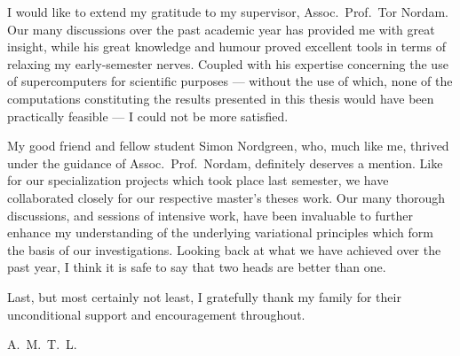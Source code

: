 I would like to extend my gratitude to my supervisor, Assoc.\ Prof.\ Tor
Nordam. Our many discussions over the past academic year has provided me with
great insight, while his great knowledge and humour proved excellent tools in
terms of relaxing my early-semester nerves. Coupled with his expertise
concerning the use of supercomputers for scientific purposes --- without the
use of which, none of the computations constituting the results presented in
this thesis would have been practically feasible --- I could not be more
satisfied.

My good friend and fellow student Simon Nordgreen, who, much like me, thrived
under the guidance of Assoc.\ Prof.\ Nordam, definitely deserves a mention. Like
for our specialization projects which took place last semester, we have
collaborated closely for our respective master's theses work. Our many thorough
discussions, and sessions of intensive work, have been invaluable to further
enhance my understanding of the underlying variational principles which form
the basis of our investigations. Looking back at what we have achieved over the
past year, I think it is safe to say that two heads are better than one.

Last, but most certainly not least, I gratefully thank my family for their
unconditional support and encouragement throughout.

\begin{minipage}[t]{\textwidth}
\begin{flushright}
A.\ M.\ T.\ L.
\end{flushright}
\end{minipage}
